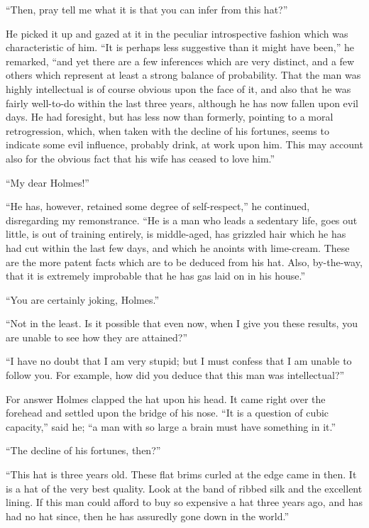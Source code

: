 “Then, pray tell me what it is that you can infer from this
hat?”

He picked it up and gazed at it in the peculiar introspective
fashion which was characteristic of him. “It is perhaps
less suggestive than it might have been,” he remarked, “and
yet there are a few inferences which are very distinct, and a
few others which represent at least a strong balance of probability.
That the man was highly intellectual is of course
obvious upon the face of it, and also that he was fairly well-to-do
within the last three years, although he has now fallen
upon evil days. He had foresight, but has less now than formerly,
pointing to a moral retrogression, which, when taken
with the decline of his fortunes, seems to indicate some evil
influence, probably drink, at work upon him. This may account
also for the obvious fact that his wife has ceased to love
him.”

“My dear Holmes!”

“He has, however, retained some degree of self-respect,”
he continued, disregarding my remonstrance. “He is a man
who leads a sedentary life, goes out little, is out of training
entirely, is middle-aged, has grizzled hair which he has had
cut within the last few days, and which he anoints with lime-cream.
These are the more patent facts which are to be deduced
from his hat. Also, by-the-way, that it is extremely
improbable that he has gas laid on in his house.”

“You are certainly joking, Holmes.”

“Not in the least. Is it possible that even now, when I
give you these results, you are unable to see how they are
attained?”

“I have no doubt that I am very stupid; but I must confess
that I am unable to follow you. For example, how did
you deduce that this man was intellectual?”

For answer Holmes clapped the hat upon his head. It
came right over the forehead and settled upon the bridge of
his nose. “It is a question of cubic capacity,” said he; “a
man with so large a brain must have something in it.”

“The decline of his fortunes, then?”

“This hat is three years old. These flat brims curled at
the edge came in then. It is a hat of the very best quality.
Look at the band of ribbed silk and the excellent lining. If
this man could afford to buy so expensive a hat three years
ago, and has had no hat since, then he has assuredly gone
down in the world.”

